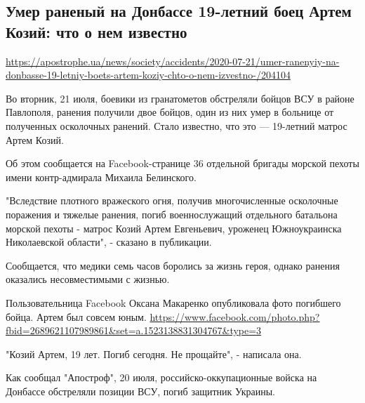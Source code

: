  
 

\clearpage
\subsection{Умер раненый на Донбассе 19-летний боец Артем Козий: что о нем известно}
\label{sec:21_07_2020.kozii.1}
\url{https://apostrophe.ua/news/society/accidents/2020-07-21/umer-ranenyiy-na-donbasse-19-letniy-boets-artem-koziy-chto-o-nem-izvestno-/204104}


Во вторник, 21 июля, боевики из гранатометов обстреляли бойцов ВСУ в районе
Павлополя, ранения получили двое бойцов, один из них умер в больнице от
полученных осколочных ранений. Стало известно, что это --- 19-летний матрос Артем
Козий.

Об этом сообщается на Facebook-странице 36 отдельной бригады морской пехоты
имени контр-адмирала Михаила Белинского.

"Вследствие плотного вражеского огня, получив многочисленные осколочные
поражения и тяжелые ранения, погиб военнослужащий отдельного батальона морской
пехоты - матрос Козий Артем Евгеньевич, уроженец Южноукраинска Николаевской
области", - сказано в публикации. 

Сообщается, что медики семь часов боролись за жизнь героя, однако ранения
оказались несовместимыми с жизнью.

Пользовательница Facebook Оксана Макаренко опубликовала фото погибшего бойца.
Артем был совсем юным. \url{https://www.facebook.com/photo.php?fbid=2689621107989861&set=a.1523138831304767&type=3}

\def\sectitle{Умер раненый на Донбассе 19-летний боец Артем Козий: что о нем известно}

"Козий Артем, 19 лет. Погиб сегодня. Не прощайте", - написала она.

Как сообщал "Апостроф", 20 июля, российско-оккупационные войска на Донбассе
обстреляли позиции ВСУ, погиб защитник Украины. 

